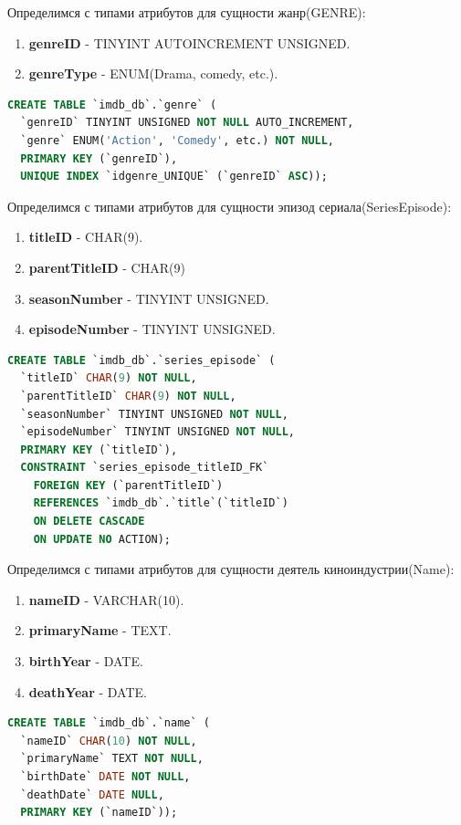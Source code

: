 \documentclass[12pt,a4paper]{article}
\begin{document}
Определимся с типами атрибутов для сущности жанр(GENRE):
\begin{enumerate}
    \item \textbf{genreID} - TINYINT AUTOINCREMENT UNSIGNED.
    \item \textbf{genreType} - ENUM(Drama, comedy, etc.).
\end{enumerate} \par
\begin{lstlisting}[language=SQL]
CREATE TABLE `imdb_db`.`genre` (
  `genreID` TINYINT UNSIGNED NOT NULL AUTO_INCREMENT,
  `genre` ENUM('Action', 'Comedy', etc.) NOT NULL,
  PRIMARY KEY (`genreID`),
  UNIQUE INDEX `idgenre_UNIQUE` (`genreID` ASC));
\end{lstlisting}
Определимся с типами атрибутов для сущности эпизод сериала(SeriesEpisode):
\begin{enumerate}
    \item \textbf{titleID} - CHAR(9).
    \item \textbf{parentTitleID} - CHAR(9)
    \item \textbf{seasonNumber} - TINYINT UNSIGNED.
    \item \textbf{episodeNumber} - TINYINT UNSIGNED.
\end{enumerate} \par
\begin{lstlisting}[language=SQL]
CREATE TABLE `imdb_db`.`series_episode` (
  `titleID` CHAR(9) NOT NULL,
  `parentTitleID` CHAR(9) NOT NULL,
  `seasonNumber` TINYINT UNSIGNED NOT NULL,
  `episodeNumber` TINYINT UNSIGNED NOT NULL,
  PRIMARY KEY (`titleID`),
  CONSTRAINT `series_episode_titleID_FK` 
    FOREIGN KEY (`parentTitleID`)
    REFERENCES `imdb_db`.`title`(`titleID`) 
    ON DELETE CASCADE
    ON UPDATE NO ACTION);
\end{lstlisting}
Определимся с типами атрибутов для сущности деятель киноиндустрии(Name):
\begin{enumerate}
    \item \textbf{nameID} - VARCHAR(10).
    \item \textbf{primaryName} - TEXT.
    \item \textbf{birthYear} - DATE.
    \item \textbf{deathYear} - DATE.
\end{enumerate} \par
\begin{lstlisting}[language=SQL]
CREATE TABLE `imdb_db`.`name` (
  `nameID` CHAR(10) NOT NULL,
  `primaryName` TEXT NOT NULL,
  `birthDate` DATE NOT NULL,
  `deathDate` DATE NULL,
  PRIMARY KEY (`nameID`));
\end{lstlisting}
\end{document}
